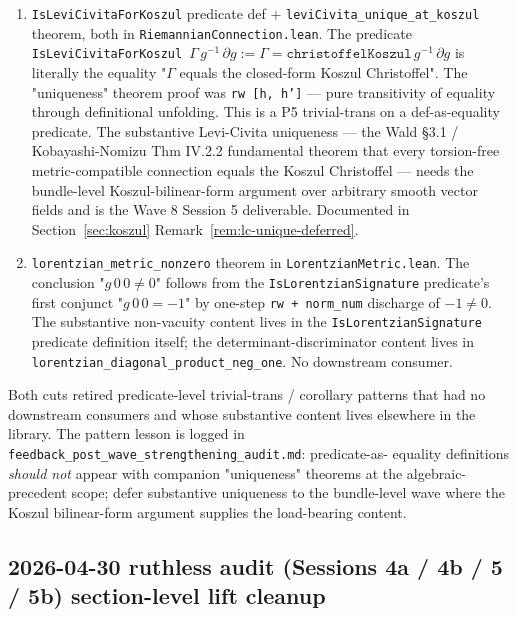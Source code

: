 \documentclass[twocolumn]{revtex4-2}
\newcommand{\Christoffel}{\Gamma}
\newcommand{\MetricMatrix}{g}
\newcommand{\PartG}{\partial g}
\begin{document}
\begin{enumerate}
  \item \texttt{IsLeviCivitaForKoszul} predicate def +
    \texttt{leviCivita\_unique\_at\_koszul} theorem, both in
    \texttt{RiemannianConnection.lean}. The predicate
    \texttt{IsLeviCivitaForKoszul $\Christoffel\, \MetricMatrix^{-1}\,
    \PartG := \Christoffel = \texttt{christoffelKoszul}\,
    \MetricMatrix^{-1}\,\PartG$} is literally the equality
    "$\Christoffel$ equals the closed-form Koszul Christoffel". The
    "uniqueness" theorem proof was \texttt{rw [h, h']} — pure
    transitivity of equality through definitional unfolding. This is
    a P5 trivial-trans on a def-as-equality predicate. The substantive
    Levi-Civita uniqueness — the Wald §3.1 / Kobayashi-Nomizu Thm
    IV.2.2 fundamental theorem that every torsion-free
    metric-compatible connection equals the Koszul Christoffel — needs
    the bundle-level Koszul-bilinear-form argument over arbitrary
    smooth vector fields and is the Wave 8 Session 5 deliverable.
    Documented in Section~\ref{sec:koszul} Remark~\ref{rem:lc-unique-deferred}.
  \item \texttt{lorentzian\_metric\_nonzero} theorem in
    \texttt{LorentzianMetric.lean}. The conclusion
    "$\MetricMatrix\,0\,0 \neq 0$" follows from the
    \texttt{IsLorentzianSignature} predicate's first conjunct
    "$\MetricMatrix\,0\,0 = -1$" by one-step \texttt{rw + norm\_num}
    discharge of $-1 \neq 0$. The substantive non-vacuity content
    lives in the \texttt{IsLorentzianSignature} predicate definition
    itself; the determinant-discriminator content lives in
    \texttt{lorentzian\_diagonal\_product\_neg\_one}. No downstream
    consumer.
\end{enumerate}

Both cuts retired predicate-level trivial-trans / corollary patterns
that had no downstream consumers and whose substantive content lives
elsewhere in the library. The pattern lesson is logged in
\texttt{feedback\_post\_wave\_strengthening\_audit.md}: predicate-as-
equality definitions \emph{should not} appear with companion
"uniqueness" theorems at the algebraic-precedent scope; defer
substantive uniqueness to the bundle-level wave where the Koszul
bilinear-form argument supplies the load-bearing content.

\subsection{2026-04-30 ruthless audit (Sessions 4a / 4b / 5 / 5b)
section-level lift cleanup}\label{sec:strengthening-w8-audit}
\end{document}
